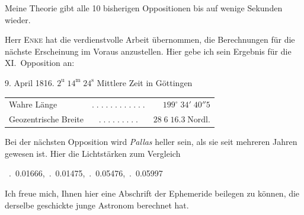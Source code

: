 \par\indent Meine Theorie gibt alle 10 bisherigen Oppositionen bis auf wenige Sekunden wieder.

\par\indent Herr \textsc{Enke} hat die verdienstvolle Arbeit übernommen, die Berechnungen für die nächste Erscheinung im Voraus anzustellen. Hier gebe ich sein Ergebnis für die XI.\ Opposition an:

\begin{center}9. April 1816. $2^{\mathrm u}\;14^{\mathrm m}\;24^{\mathrm s}$ Mittlere Zeit in Göttingen\end{center}
\begin{center}\fontsize{10}{12}\selectfont\setlength{\tabcolsep}{3pt}\renewcommand{\arraystretch}{1.15}\begin{tabular}{lcr}
Wahre Länge & $.\;.\;.\;.\;.\;.\;.\;.\;.\;.\;.\;.$ & $199^\circ\;34'\;40''5$\\
Geozentrische Breite & $.\;.\;.\;.\;.\;.\;.\;.\;.$ & $28\;6\;16.3\;\text{Nordl.}$\\
\end{tabular}\end{center}

\par\indent Bei der nächsten Opposition wird \emph{Pallas} heller sein, als sie seit mehreren Jahren gewesen ist. Hier die Lichtstärken zum Vergleich

\begin{center}\fontsize{9}{11}\ .\ 0.01666,\ .\ 0.01475,\ .\ 0.05476,\ .\ 0.05997
\end{center}

\par\indent Ich freue mich, Ihnen hier eine Abschrift der Ephemeride beilegen zu können, die derselbe geschickte junge Astronom berechnet hat.

